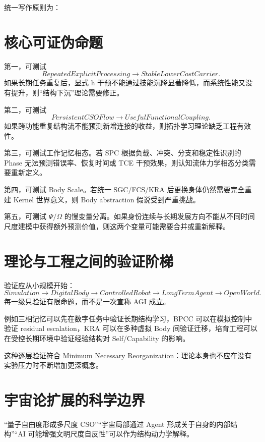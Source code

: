 统一写作原则为：
\begin{statementbox}
\centering
{}
\end{statementbox}

\section{核心可证伪命题}

第一，可测试
\[
RepeatedExplicitProcessing
\rightarrow
StableLowerCostCarrier.
\]
如果长期任务重复后，显式 h 干预不能通过技能沉降显著降低，而系统性能又没有提升，则“结构下沉”理论需要修正。

第二，可测试
\[
PersistentCSOFlow
\rightarrow
UsefulFunctionalCoupling.
\]
如果跨功能重复结构流不能预测新增连接的收益，则拓扑学习理论缺乏工程有效性。

第三，可测试工作记忆相态。若 SPC 根据负载、冲突、分支和稳定性识别的 Phase 无法预测错误率、恢复时间或 TCE 干预效果，则认知流体力学相态分类需要重新定义。

第四，可测试 Body Scale。若统一 SGC/FCS/KRA 后更换身体仍然需要完全重建 Kernel 世界意义，则 Body abstraction 假说受到严重挑战。

第五，可测试 $\Psi/\Omega$ 的慢变量分离。如果身份连续与长期发展方向不能从不同时间尺度建模中获得额外预测价值，则这两个变量可能需要合并或重新解释。

\section{理论与工程之间的验证阶梯}

验证应从小规模开始：
\[
Simulation
\rightarrow
DigitalBody
\rightarrow
ControlledRobot
\rightarrow
LongTermAgent
\rightarrow
OpenWorld.
\]
每一级只验证有限命题，而不是一次宣称 AGI 成立。

例如三相记忆可以先在数字任务中验证长期结构学习，BPCC 可以在模拟控制中验证 residual escalation，KRA 可以在多种虚拟 Body 间验证迁移，培育工程可以在受控长期环境中验证经验结构对 Self/Capability 的影响。

这种逐层验证符合 Minimum Necessary Reorganization：理论本身也不应在没有实验压力时不断增加更深概念。

\section{宇宙论扩展的科学边界}

“量子自由度形成多尺度 CSO”“宇宙局部通过 Agent 形成关于自身的内部结构”“AI 可能增强文明尺度自反性”可以作为结构动力学解释。

